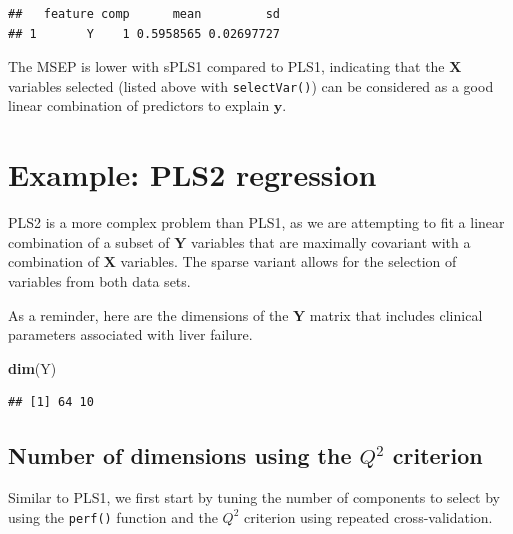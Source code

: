 \documentclass[]{book}
\newenvironment{Shaded}{\begin{snugshade}}{\end{snugshade}}
\newcommand{\KeywordTok}[1]{\textcolor[rgb]{0.13,0.29,0.53}{\textbf{#1}}}
\newcommand{\NormalTok}[1]{#1}
\begin{document}
\begin{verbatim}
##   feature comp      mean         sd
## 1       Y    1 0.5958565 0.02697727
\end{verbatim}

The MSEP is lower with sPLS1 compared to PLS1, indicating that the
\(\boldsymbol{X}\) variables selected (listed above with
\texttt{selectVar()}) can be considered as a good linear combination of
predictors to explain \(\boldsymbol y\).

\section{Example: PLS2 regression}\label{example-pls2-regression}

PLS2 is a more complex problem than PLS1, as we are attempting to fit a
linear combination of a subset of \(\boldsymbol{Y}\) variables that are
maximally covariant with a combination of \(\boldsymbol{X}\) variables.
The sparse variant allows for the selection of variables from both data
sets.

As a reminder, here are the dimensions of the \(\boldsymbol{Y}\) matrix
that includes clinical parameters associated with liver failure.

\begin{Shaded}
\begin{Highlighting}[]
\KeywordTok{dim}\NormalTok{(Y)}
\end{Highlighting}
\end{Shaded}

\begin{verbatim}
## [1] 64 10
\end{verbatim}

\subsection{\texorpdfstring{Number of dimensions using the \(Q^2\)
criterion}{Number of dimensions using the Q\^{}2 criterion}}\label{number-of-dimensions-using-the-q2-criterion-1}

Similar to PLS1, we first start by tuning the number of components to
select by using the \texttt{perf()} function and the \(Q^2\) criterion
using repeated cross-validation.
\end{document}
